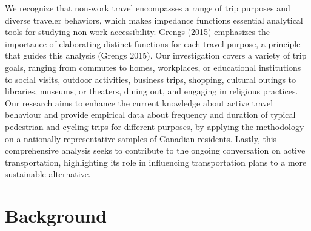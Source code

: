 \documentclass[preprint, 3p,
authoryear]{elsarticle} %
\begin{document}
We recognize that non-work travel encompasses a range of trip purposes
and diverse traveler behaviors, which makes impedance functions
essential analytical tools for studying non-work accessibility. Grengs
(2015) emphasizes the importance of elaborating distinct functions for
each travel purpose, a principle that guides this analysis (Grengs
2015). Our investigation covers a variety of trip goals, ranging from
commutes to homes, workplaces, or educational institutions to social
visits, outdoor activities, business trips, shopping, cultural outings
to libraries, museums, or theaters, dining out, and engaging in
religious practices. Our research aims to enhance the current knowledge
about active travel behaviour and provide empirical data about frequency
and duration of typical pedestrian and cycling trips for different
purposes, by applying the methodology on a nationally representative
samples of Canadian residents. Lastly, this comprehensive analysis seeks
to contribute to the ongoing conversation on active transportation,
highlighting its role in influencing transportation plans to a more
sustainable alternative.

\hypertarget{background}{%
\section{Background}\label{background}}
\end{document}

